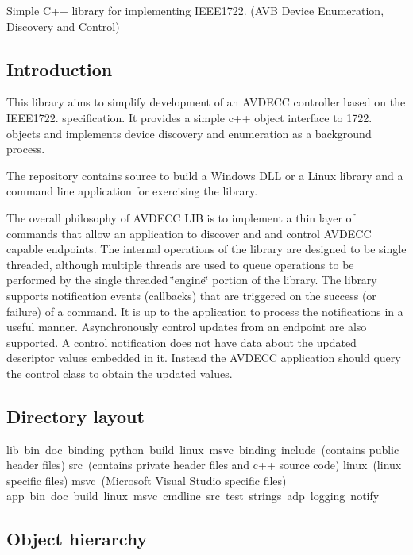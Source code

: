 Simple C++ library for implementing I\+E\+E\+E1722. (A\+VB Device Enumeration, Discovery and Control)

\subsection*{Introduction }

This library aims to simplify development of an A\+V\+D\+E\+CC controller based on the I\+E\+E\+E1722. specification. It provides a simple c++ object interface to 1722. objects and implements device discovery and enumeration as a background process.

The repository contains source to build a Windows D\+LL or a Linux library and a command line application for exercising the library.

The overall philosophy of A\+V\+D\+E\+CC L\+IB is to implement a thin layer of commands that allow an application to discover and and control A\+V\+D\+E\+CC capable endpoints. The internal operations of the library are designed to be single threaded, although multiple threads are used to queue operations to be performed by the single threaded \char`\"{}engine\char`\"{} portion of the library. The library supports notification events (callbacks) that are triggered on the success (or failure) of a command. It is up to the application to process the notifications in a useful manner. Asynchronously control updates from an endpoint are also supported. A control notification does not have data about the updated descriptor values embedded in it. Instead the A\+V\+D\+E\+CC application should query the control class to obtain the updated values.

\subsection*{Directory layout }

\begin{DoxyVerb}lib\
  bin\
  doc\
  binding\
    python\
  build\
    linux\
    msvc\
  binding\
  include\ (contains public header files)
  src\ (contains private header files and c++ source code)
  linux\ (linux specific files)
    msvc\ (Microsoft Visual Studio specific files)
app\
  bin\
  doc\
  build\
    linux\
    msvc\
  cmdline\
    src\
  test\
    strings\
    adp\
    logging\ 
    notify\
\end{DoxyVerb}


\subsection*{Object hierarchy }

